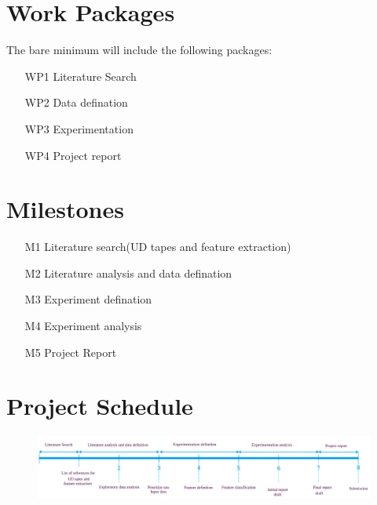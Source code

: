 \documentclass[rnd]{mas_proposal}
\begin{document}
\section{Work Packages}
The bare minimum will include the following packages:
\begin{enumerate}
    \item[WP1] Literature Search
    \item[WP2] Data defination
    \item[WP3] Experimentation
    \item[WP4] Project report
\end{enumerate}

\section{Milestones}

\begin{enumerate}
    \item[M1] Literature search(UD tapes and feature extraction)
    \item[M2] Literature analysis and data defination
    \item[M3] Experiment defination
    \item[M4] Experiment analysis
    \item[M5] Project Report
 \end{enumerate}
\vspace{50px}
\section{Project Schedule}

\begin{figure}[h!]
    \includegraphics[width=1\textwidth]{timeschedule}
    \caption{}
    \label{}
\end{figure}
\pagebreak
\end{document}
